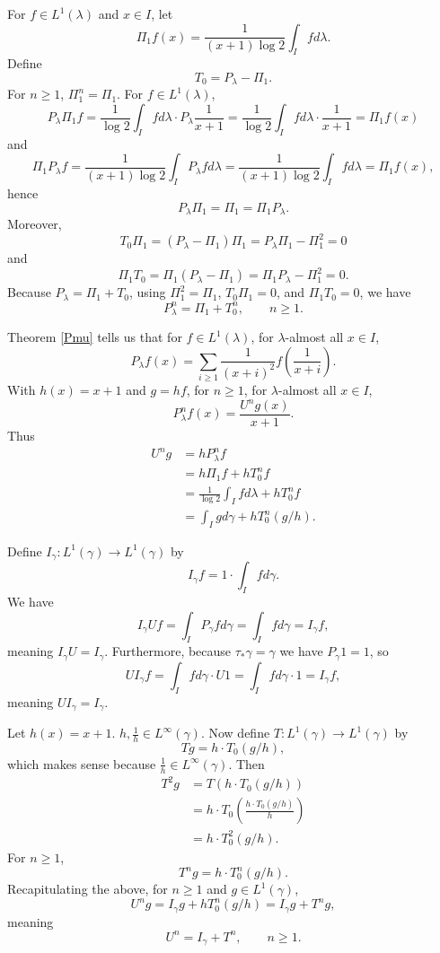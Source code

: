\documentclass{article}
\theoremstyle{definition}
\theoremstyle{definition}
\begin{document}
For $f \in L^1(\lambda)$ and $x \in I$, let
\[
\Pi_1 f(x) = \frac{1}{(x+1) \log 2} \int_I f d\lambda.
\]
Define
\[
T_0 = P_\lambda - \Pi_1.
\]
For $n \geq 1$, $\Pi_1^n = \Pi_1$. For $f \in L^1(\lambda)$,
\[
P_\lambda \Pi_1 f =  \frac{1}{\log 2} \int_I f d\lambda\cdot P_\lambda \frac{1}{x+1}
= \frac{1}{\log 2} \int_I f d\lambda\cdot\frac{1}{x+1}
=\Pi_1 f(x)
\]
and
\[
\Pi_1 P_\lambda f=\frac{1}{(x+1)\log 2} \int_I P_\lambda f d\lambda
=\frac{1}{(x+1)\log 2} \int_I f d\lambda=\Pi_1 f(x),
\]
hence
\[
P_\lambda \Pi_1 = \Pi_1 = \Pi_1 P_\lambda.
\]
Moreover,
\[
T_0 \Pi_1 = (P_\lambda-\Pi_1) \Pi_1 = P_\lambda \Pi_1 - \Pi_1^2
=0
\]
and
\[
\Pi_1 T_0 = \Pi_1(P_\lambda-\Pi_1) = \Pi_1 P_\lambda - \Pi_1^2
=0.
\]
Because $P_\lambda=\Pi_1+T_0$, using $\Pi_1^2=\Pi_1$,
$T_0 \Pi_1 = 0$, and
$\Pi_1 T_0 = 0$, we have
\[
P_\lambda^n = \Pi_1+T_0^n,\qquad n \geq 1.
\]

Theorem \ref{Pmu} tells us that for $f \in L^1(\lambda)$, 
for $\lambda$-almost all $x \in I$,
\[
P_\lambda f(x) = \sum_{i \geq 1} \frac{1}{(x+i)^2} f\left(\frac{1}{x+i}\right).
\]
With $h(x)=x+1$ and $g=hf$, for $n \geq 1$, for $\lambda$-almost all $x \in I$,
\[
P_\lambda^n f(x) = \frac{U^n g(x)}{x+1}.
\]
Thus
\begin{align*}
U^n g &= h P_\lambda^n f\\
&= h \Pi_1 f + h T_0^n f\\
&= \frac{1}{\log 2} \int_I f d\lambda + h T_0^n f\\
&=\int_I g d\gamma + h T_0^n(g/h).
\end{align*}

Define $I_\gamma:L^1(\gamma) \to L^1(\gamma)$ by 
\[
I_\gamma f = 1 \cdot \int_I f d\gamma.
\]
We have
\[
I_\gamma U f = \int_I P_\gamma f d\gamma = \int_I f d\gamma = I_\gamma f,
\]
meaning $I_\gamma U = I_\gamma$. Furthermore, because
$\tau_* \gamma = \gamma$ we have $P_\gamma 1 = 1$, so
\[
U I_\gamma f =  \int_I f d\gamma \cdot U 1 = \int_I f d\gamma \cdot 1 = I_\gamma f ,
\]
meaning $U I_\gamma = I_\gamma$. 

Let $h(x)=x+1$. $h, \frac{1}{h} \in L^\infty(\gamma)$.
Now define $T:L^1(\gamma) \to L^1(\gamma)$ by
\[
T g = h \cdot T_0(g/h),
\]
which makes sense because $\frac{1}{h} \in L^\infty(\gamma)$. 
Then
\begin{align*}
T^2 g& = T(h \cdot T_0(g/h))\\
&= h \cdot T_0\left(\frac{h \cdot T_0(g/h)}{h}\right)\\
&=h \cdot T_0^2(g/h).
\end{align*}
For $n \geq 1$,
\[
T^n g = h \cdot T_0^n(g/h).
\]
Recapitulating the above, for $n \geq 1$ and $g \in L^1(\gamma)$, 
\[
U^n g = I_\gamma g + h T_0^n(g/h) = I_\gamma g + T^n g,
\]
meaning
\[
U^n = I_\gamma + T^n,\qquad n \geq 1.
\]
\end{document}
